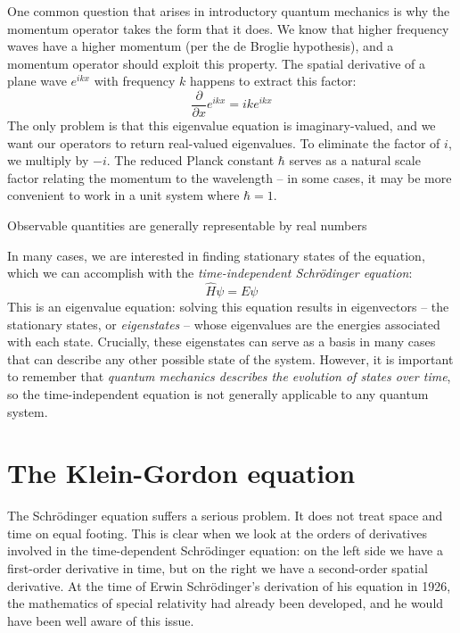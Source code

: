 One common question that arises in introductory quantum mechanics is why the momentum operator takes
the form that it does. We know that higher frequency waves have a higher momentum (per the de 
Broglie hypothesis), and a momentum operator should exploit this property. The spatial derivative of
a plane wave $e^{ikx}$ with frequency $k$ happens to extract this factor:
\begin{equation*}
\frac{\partial}{\partial x} e^{ikx} = ik e^{ikx}
\end{equation*}
The only problem is that this eigenvalue equation is imaginary-valued, and we want our operators to
return real-valued eigenvalues. To eliminate the factor of $i$, we multiply by $-i$. The reduced
Planck constant $\hbar$ serves as a natural scale factor relating the momentum to the wavelength --
in some cases, it may be more convenient to work in a unit system where $\hbar = 1$.

Observable quantities are generally representable by real numbers

In many cases, we are interested in finding stationary states of the equation, which we can
accomplish with the \textit{time-independent Schrödinger equation}:
\begin{equation}
\hat{H} \psi = E \psi
\end{equation}
This is an eigenvalue equation: solving this equation results in eigenvectors -- the stationary
states, or \textit{eigenstates} -- whose eigenvalues are the energies associated with each state.
Crucially, these eigenstates can serve as a basis in many cases that can describe any other possible
state of the system. However, it is important to remember that \textit{quantum mechanics describes 
the evolution of states over time}, so the time-independent equation is not generally applicable to
any quantum system.

\section{The Klein-Gordon equation}

The Schrödinger equation suffers a serious problem. It does not treat space and time on equal
footing. This is clear when we look at the orders of derivatives involved in the time-dependent
Schrödinger equation: on the left side we have a first-order derivative in time, but on the right
we have a second-order spatial derivative. At the time of Erwin Schrödinger's derivation of his
equation in 1926, the mathematics of special relativity had already been developed, and he would
have been well aware of this issue.

